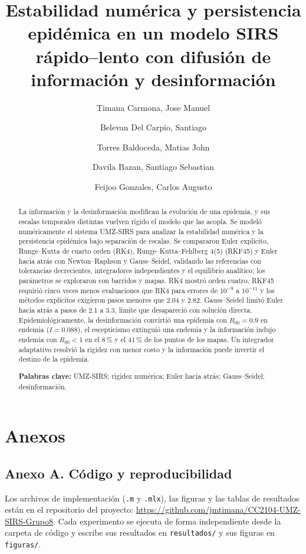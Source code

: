 \documentclass[final,5p,times,twocolumn,authoryear,11pt,nopreprintline]{elsarticle}
\newcommand{\tituloProyecto}{Estabilidad numérica y persistencia epidémica en un modelo SIRS rápido--lento con difusión de información y desinformación}
\begin{document}
\begin{frontmatter}
\title{\tituloProyecto}
\author[utec]{Timana Carmona, Jose Manuel}
\author[utec]{Belevan Del Carpio, Santiago}
\author[utec]{Torres Baldoceda, Matias John}
\author[utec]{Davila Bazan, Santiago Sebastian}
\author[utec]{Feijoo Gonzales, Carlos Augusto}
\address[utec]{Universidad de Ingeniería y Tecnología, Departamento Académico de Ciencias}

\begin{abstract}
La información y la desinformación modifican la evolución de una epidemia, y sus escalas temporales distintas vuelven rígido el modelo que las acopla. Se modeló numéricamente el sistema UMZ-SIRS para analizar la estabilidad numérica y la persistencia epidémica bajo separación de escalas. Se compararon Euler explícito, Runge--Kutta de cuarto orden (RK4), Runge--Kutta--Fehlberg 4(5) (RKF45) y Euler hacia atrás con Newton--Raphson y Gauss--Seidel, validando las referencias con tolerancias decrecientes, integradores independientes y el equilibrio analítico; los parámetros se exploraron con barridos y mapas. RK4 mostró orden cuatro, RKF45 requirió cinco veces menos evaluaciones que RK4 para errores de $10^{-9}$ a $10^{-11}$ y los métodos explícitos exigieron pasos menores que 2.04 y 2.82. Gauss--Seidel limitó Euler hacia atrás a pasos de 2.1 a 3.3, límite que desapareció con solución directa. Epidemiológicamente, la desinformación convirtió una epidemia con $R_{00}=0.9$ en endemia ($I=0.088$), el escepticismo extinguió una endemia y la información indujo endemia con $R_{00}<1$ en el 8\,\% y el 41\,\% de los puntos de los mapas. Un integrador adaptativo resolvió la rigidez con menor costo y la información puede invertir el destino de la epidemia.

\medskip\noindent\textbf{Palabras clave:} UMZ-SIRS; rigidez numérica; Euler hacia atrás; Gauss--Seidel; desinformación.
\end{abstract}
\end{frontmatter}








\clearpage
\section*{Anexos}
\subsection*{Anexo A. Código y reproducibilidad}
Los archivos de implementación (\texttt{.m} y \texttt{.mlx}), las figuras y las tablas de resultados están en el repositorio del proyecto: \url{https://github.com/jmtimana/CC2104-UMZ-SIRS-Grupo8}. Cada experimento se ejecuta de forma independiente desde la carpeta de código y escribe sus resultados en \texttt{resultados/} y sus figuras en \texttt{figuras/}.
\end{document}
